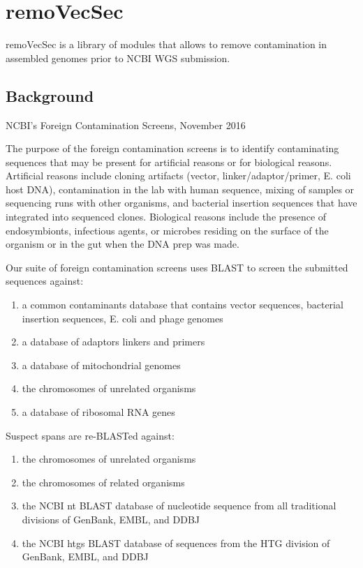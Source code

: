 \documentclass[11pt]{article}
\author{htafer}
\date{\today}
\title{}
\begin{document}
\tableofcontents

\section{remoVecSec}
\label{sec:org358c50a}

remoVecSec is a library of modules that allows to remove contamination
in assembled genomes prior to NCBI WGS submission. 

\subsection{Background}
\label{sec:org5f828fc}
NCBI's Foreign Contamination Screens, November 2016

The purpose of the foreign contamination screens is to identify
contaminating sequences that may be present for artificial reasons or
for biological reasons. Artificial reasons include cloning artifacts
(vector, linker/adaptor/primer, E. coli host DNA), contamination in the
lab with human sequence, mixing of samples or sequencing runs with other
organisms, and bacterial insertion sequences that have integrated into
sequenced clones. Biological reasons include the presence of
endosymbionts, infectious agents, or microbes residing on the surface of
the organism or in the gut when the DNA prep was made.

Our suite of foreign contamination screens uses BLAST to screen the
submitted sequences against:

\begin{enumerate}
\item a common contaminants database that contains vector sequences,
bacterial insertion sequences, E. coli and phage genomes

\item a database of adaptors linkers and primers

\item a database of mitochondrial genomes

\item the chromosomes of unrelated organisms

\item a database of ribosomal RNA genes
\end{enumerate}

Suspect spans are re-BLASTed against:

\begin{enumerate}
\item the chromosomes of unrelated organisms

\item the chromosomes of related organisms

\item the NCBI nt BLAST database of nucleotide sequence from all
traditional divisions of GenBank, EMBL, and DDBJ

\item the NCBI htgs BLAST database of sequences from the HTG division of
GenBank, EMBL, and DDBJ
\end{enumerate}
\end{document}
